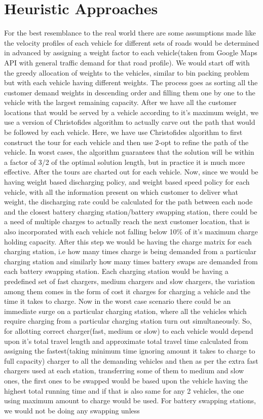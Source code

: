 \documentclass[conference]{IEEEtran}
\begin{document}
\section{Heuristic Approaches} \label{sec:sa}
For the best resemblance to the real world there are some assumptions made like the velocity profiles of each vehicle for different sets of roads would be determined in advanced by assigning a weight factor to each vehicle(taken from Google Maps API with general traffic demand for that road profile). We would start off with the greedy allocation of weights to the vehicles, similar to bin packing problem but with each vehicle having different weights. The process goes as sorting all the customer demand weights in descending order and filling them one by one to the vehicle with the largest remaining capacity. After we have all the customer locations that would be served by a vehicle according to it's maximum weight, we use a version of Christofides algorithm to actually carve out the path that would be followed by each vehicle. Here, we have use Christofides algorithm to first construct the tour for each vehicle and then use 2-opt to refine the path of the vehicle. In worst cases, the algorithm guarantees that the solution will be within a factor of 3/2 of the optimal solution length, but in practice it is much more effective. After the tours are charted out for each vehicle. Now, since we would be having weight based discharging policy, and weight based speed policy for each vehicle, with all the information present on which customer to deliver what weight, the discharging rate could be calculated for the path between each node and the closest battery charging station/battery swapping station, there could be a need of multiple charges to actually reach the next customer location, that is also incorporated with each vehicle not falling below 10\% of it's maximum charge holding capacity. After this step we would be having the charge matrix for each charging station, i.e how many times charge is being demanded from a particular charging station and similarly how many times battery swaps are demanded from each battery swapping station. Each charging station would be having a predefined set of fast chargers, medium chargers and slow chargers, the variation among them comes in the form of cost it charges for charging a vehicle and the time it takes to charge. Now in the worst case scenario there could be an immediate surge on a particular charging station, where all the vehicles which require charging from a particular charging station turn out simultaneously. So, for allotting correct charger(fast, medium or slow) to each vehicle would depend upon it's total travel length and approximate total travel time calculated from assigning the fastest(taking minimum time ignoring amount it takes to charge to full capacity) charger to all the demanding vehicles and then as per the extra fast chargers used at each station, transferring some of them to medium and slow ones, the first ones to be swapped would be based upon the vehicle having the highest total running time and if that is also same for any 2 vehicles, the one using maximum amount to charge would be used. For battery swapping stations, we would not be doing any swapping unless 
\end{document}
